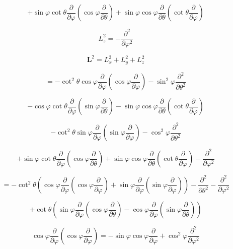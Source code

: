 \documentclass[12pt]{article}
\begin{document}
\[
    + \sin{\varphi} \cot{\theta}\frac{\partial}{\partial \varphi}
    \left(\cos{\varphi} \frac{\partial}{\partial \theta}\right)
    + \sin{\varphi} \cos{\varphi} \frac{\partial}{\partial \theta}
    \left(\cot{\theta} \frac{\partial}{\partial \varphi}\right)
\]

\[
    L_z^2 = - \frac{\partial^2}{\partial \varphi^2}
\]

\[
    \textbf{L}^2 = L_x^2 + L_y^2 + L_z^2
\]

\[
    = - \cot^2{\theta} \cos{\varphi} \frac{\partial}{\partial \varphi}
    \left(\cos{\varphi} \frac{\partial}{\partial \varphi}\right)
    - \sin^2{\varphi} \frac{\partial^2}{\partial \theta^2}
\]

\[
    - \cos{\varphi} \cot{\theta}\frac{\partial}{\partial \varphi}
    \left(\sin{\varphi} \frac{\partial}{\partial \theta}\right)
    - \sin{\varphi} \cos{\varphi} \frac{\partial}{\partial \theta}
    \left(\cot{\theta}\frac{\partial}{\partial \varphi}\right)
\]

\[
    - \cot^2{\theta} \sin{\varphi} \frac{\partial}{\partial \varphi}
    \left(\sin{\varphi} \frac{\partial}{\partial \varphi}\right)
    - \cos^2{\varphi} \frac{\partial^2}{\partial \theta^2}
\]

\[
    + \sin{\varphi} \cot{\theta}\frac{\partial}{\partial \varphi}
    \left(\cos{\varphi} \frac{\partial}{\partial \theta}\right)
    + \sin{\varphi} \cos{\varphi} \frac{\partial}{\partial \theta}
    \left(\cot{\theta} \frac{\partial}{\partial \varphi}\right)
    - \frac{\partial^2}{\partial \varphi^2}
\]

\[
    = - \cot^2{\theta}
    \left(
    \cos{\varphi} \frac{\partial}{\partial \varphi}
    \left(\cos{\varphi} \frac{\partial}{\partial \varphi}\right)
    + \sin{\varphi} \frac{\partial}{\partial \varphi}
    \left(\sin{\varphi} \frac{\partial}{\partial \varphi} \right)
    \right)
    - \frac{\partial^2}{\partial \theta^2}
    - \frac{\partial^2}{\partial \varphi^2}
\]

\[
    + \cot{\theta}
    \left(
    \sin{\varphi} \frac{\partial}{\partial \varphi}
    \left(\cos{\varphi} \frac{\partial}{\partial \theta}\right)
    - \cos{\varphi} \frac{\partial}{\partial \varphi}
    \left(\sin{\varphi} \frac{\partial}{\partial \theta}\right)
    \right)
\]

\[
    \cos{\varphi} \frac{\partial}{\partial \varphi}
    \left(\cos{\varphi} \frac{\partial}{\partial \varphi}\right)
    = -\sin{\varphi} \cos{\varphi} \frac{\partial}{\partial \varphi}
    + \cos^2{\varphi} \frac{\partial^2}{\partial \varphi^2}
\]
\end{document}
